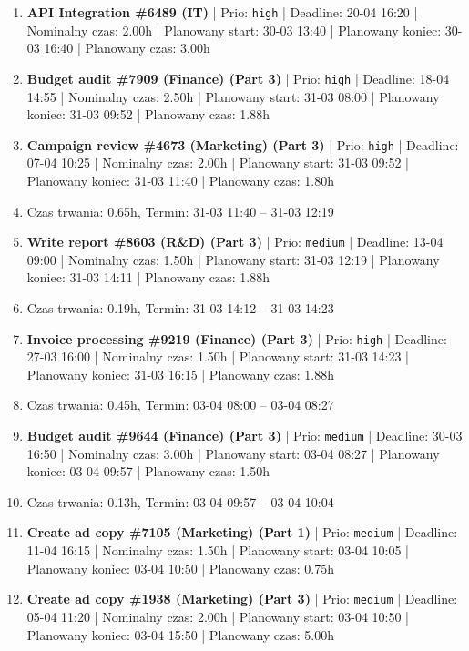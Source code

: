{\begin{enumerate}
  \item [\textbf{14620}] \textbf{API Integration \#6489 (IT)} | Prio: \texttt{high} | Deadline: 20-04 16:20 | Nominalny czas: 2.00h | Planowany start: 30-03 13:40 | Planowany koniec: 30-03 16:40 | Planowany czas: 3.00h
  \item [\textbf{14616}] \textbf{Budget audit \#7909 (Finance) (Part 3)} | Prio: \texttt{high} | Deadline: 18-04 14:55 | Nominalny czas: 2.50h | Planowany start: 31-03 08:00 | Planowany koniec: 31-03 09:52 | Planowany czas: 1.88h
  \item [\textbf{14625}] \textbf{Campaign review \#4673 (Marketing) (Part 3)} | Prio: \texttt{high} | Deadline: 07-04 10:25 | Nominalny czas: 2.00h | Planowany start: 31-03 09:52 | Planowany koniec: 31-03 11:40 | Planowany czas: 1.80h
  \item [\textbf{PRZERWA}] Czas trwania: 0.65h, Termin: 31-03 11:40 -- 31-03 12:19
  \item [\textbf{14634}] \textbf{Write report \#8603 (R\&D) (Part 3)} | Prio: \texttt{medium} | Deadline: 13-04 09:00 | Nominalny czas: 1.50h | Planowany start: 31-03 12:19 | Planowany koniec: 31-03 14:11 | Planowany czas: 1.88h
  \item [\textbf{PRZERWA}] Czas trwania: 0.19h, Termin: 31-03 14:12 -- 31-03 14:23
  \item [\textbf{14622}] \textbf{Invoice processing \#9219 (Finance) (Part 3)} | Prio: \texttt{high} | Deadline: 27-03 16:00 | Nominalny czas: 1.50h | Planowany start: 31-03 14:23 | Planowany koniec: 31-03 16:15 | Planowany czas: 1.88h
  \item [\textbf{PRZERWA}] Czas trwania: 0.45h, Termin: 03-04 08:00 -- 03-04 08:27
  \item [\textbf{14659}] \textbf{Budget audit \#9644 (Finance) (Part 3)} | Prio: \texttt{medium} | Deadline: 30-03 16:50 | Nominalny czas: 3.00h | Planowany start: 03-04 08:27 | Planowany koniec: 03-04 09:57 | Planowany czas: 1.50h
  \item [\textbf{PRZERWA}] Czas trwania: 0.13h, Termin: 03-04 09:57 -- 03-04 10:04
  \item [\textbf{14650}] \textbf{Create ad copy \#7105 (Marketing) (Part 1)} | Prio: \texttt{medium} | Deadline: 11-04 16:15 | Nominalny czas: 1.50h | Planowany start: 03-04 10:05 | Planowany koniec: 03-04 10:50 | Planowany czas: 0.75h
  \item [\textbf{14652}] \textbf{Create ad copy \#1938 (Marketing) (Part 3)} | Prio: \texttt{medium} | Deadline: 05-04 11:20 | Nominalny czas: 2.00h | Planowany start: 03-04 10:50 | Planowany koniec: 03-04 15:50 | Planowany czas: 5.00h

\end{enumerate}}
